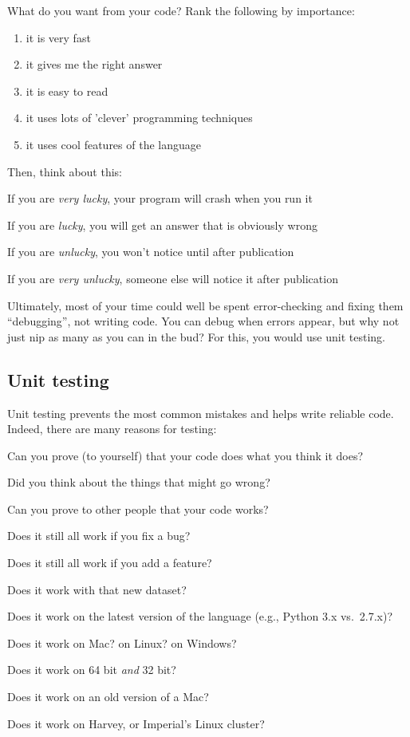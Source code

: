 What do you want from your code? Rank the following by importance:
  \begin{enumerate}
    \item it is very fast
    \item it gives me the right answer
    \item it is easy to read
    \item it uses lots of 'clever' programming techniques
    \item it uses cool features of the language
  \end{enumerate}

Then, think about this: 

  \begin{compactitem}
     \item If you are {\it very lucky}, your program will crash when you run it
     \item If you are {\it lucky}, you will get an answer that is obviously wrong
     \item If you are {\it unlucky}, you won't notice until after publication
     \item If you are {\it very unlucky}, someone else will notice it after 
publication
  \end{compactitem}
  
Ultimately, most of your time could well be spent error-checking and 
fixing them ``debugging'', not writing code. You can debug when errors 
appear, but why not just nip as many as you can in the bud? For this, 
you would use unit testing.

\subsection{Unit testing}

Unit testing prevents the most common mistakes and helps write reliable 
code. Indeed, there are many reasons for testing:
\begin{compactitem}
	\item Can you prove (to yourself) that your code does what you think it does?
	\item Did you think about the things that might go wrong?
	\item Can you prove to other people that your code works?
	\item Does it still all work if you fix a bug?
	\item Does it still all work if you add a feature?
	\item Does it work with that new dataset?
	\item Does it work on the latest version of the language (e.g., 
	Python 3.x vs.\ 2.7.x)?
	\item Does it work on Mac? on Linux? on Windows?
	\item Does it work on 64 bit {\it and} 32 bit?
	\item Does it work on an old version of a Mac?
	\item Does it work on Harvey, or Imperial's Linux cluster?
\end{compactitem}

